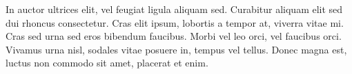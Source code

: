 \documentclass[preprint,12pt]{elsarticle}
\begin{document}
In auctor ultrices elit, vel feugiat ligula aliquam sed. Curabitur aliquam elit sed dui rhoncus consectetur. Cras elit ipsum, lobortis a tempor at, viverra vitae mi. Cras sed urna sed eros bibendum faucibus. Morbi vel leo orci, vel faucibus orci. Vivamus urna nisl, sodales vitae posuere in, tempus vel tellus. Donec magna est, luctus non commodo sit amet, placerat et enim.













\end{document}
